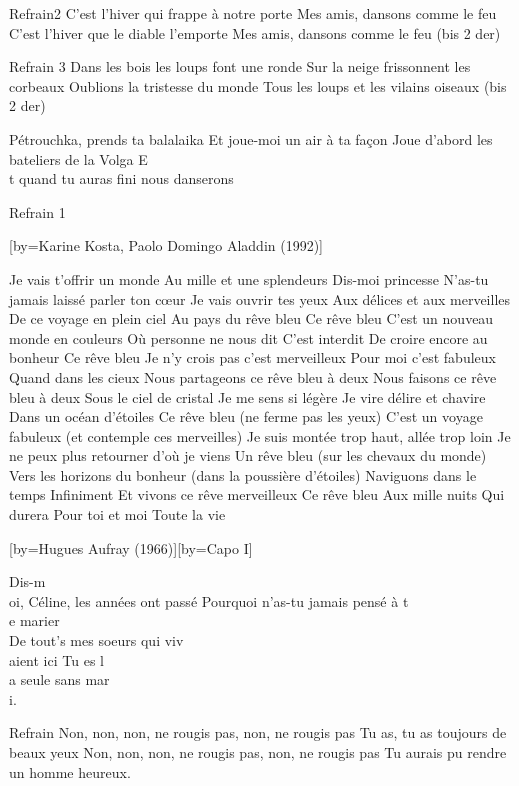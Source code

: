 	
Refrain2
C'est l'hiver qui frappe à notre porte
Mes amis, dansons comme le feu 
C'est l'hiver que le diable l'emporte
Mes amis, dansons comme le feu 
(bis 2 der)

\beginverse
Refrain 3
Dans les bois les loups font une ronde 
Sur la neige frissonnent les corbeaux
Oublions la tristesse du monde
Tous les loups et les vilains oiseaux
(bis 2 der)
\endverse

\beginverse
Pétrouchka, prends ta balalaika 
Et joue-moi un air à ta façon
Joue d'abord les bateliers de la Volga 
E\\[Mi]t quand tu auras fini nous danserons
\endverse

\beginverse
Refrain 1
\endverse

[by={Karine Kosta, Paolo Domingo \- Aladdin (1992)}]

\beginverse
Je vais t’offrir un monde
Au mille et une splendeurs
Dis-moi princesse
N’as-tu jamais laissé parler ton cœur
Je vais ouvrir tes yeux
Aux délices et aux merveilles
De ce voyage en plein ciel
Au pays du rêve bleu
Ce rêve bleu
C’est un nouveau monde en couleurs
Où personne ne nous dit
C’est interdit
De croire encore au bonheur
Ce rêve bleu
Je n’y crois pas c’est merveilleux
Pour moi c’est fabuleux
Quand dans les cieux
Nous partageons ce rêve bleu à deux
Nous faisons ce rêve bleu à deux
Sous le ciel de cristal
Je me sens si légère
Je vire délire et chavire
Dans un océan d’étoiles
Ce rêve bleu (ne ferme pas les yeux)
C’est un voyage fabuleux (et contemple ces merveilles)
Je suis montée trop haut, allée trop loin
Je ne peux plus retourner d’où je viens
Un rêve bleu (sur les chevaux du monde)
Vers les horizons du bonheur (dans la poussière d’étoiles)
Naviguons dans le temps
Infiniment
Et vivons ce rêve merveilleux
Ce rêve bleu
Aux mille nuits
Qui durera
Pour toi et moi
Toute la vie
\endverse

[by={Hugues Aufray (1966)}][by={Capo I}]

\beginverse
Dis-m\\[Mim]oi, Céline, les années ont passé
Pourquoi n'as-tu jamais pensé à t\\[Lam]e marier
\\[Ré]De tout's mes soeurs qui viv\\[Mim]aient ici
Tu es l\\[Lam]a seule sans mar\\[Rém]i.
\endverse

	Refrain
Non, non, non, ne rougis pas, non, ne rougis pas
Tu as, tu as toujours de beaux yeux
Non, non, non, ne rougis pas, non, ne rougis pas
Tu aurais pu rendre un homme heureux.


